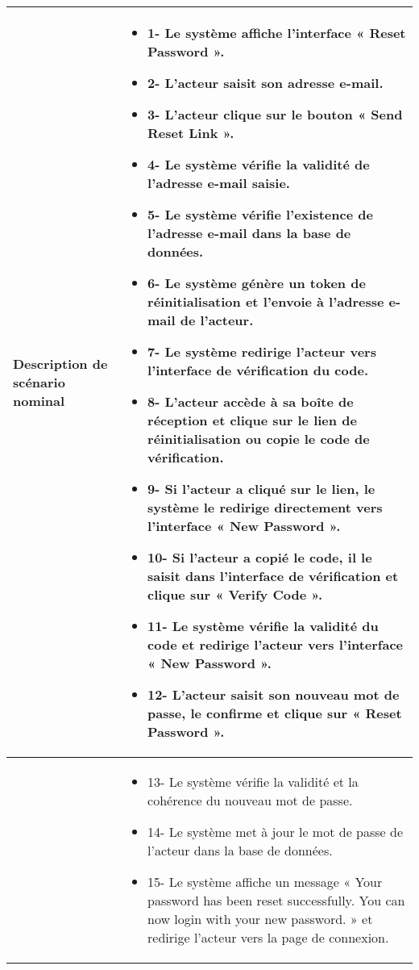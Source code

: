 \begin{longtable}{|>{\arraybackslash}p{4.2cm}|>{\arraybackslash}p{12.5cm}|}
\\
\hline
\textbf{Description de scénario nominal }  &
\begin{itemize}[label=]
\item{1-} Le système affiche l'interface « Reset Password ».
\item{2-} L'acteur saisit son adresse e-mail.
\item{3-} L'acteur clique sur le bouton « Send Reset Link ».
\item{4-} Le système vérifie la validité de l'adresse e-mail saisie.
\item{5-} Le système vérifie l'existence de l'adresse e-mail dans la base de données.
\item{6-} Le système génère un token de réinitialisation et l'envoie à l'adresse e-mail de l'acteur.
\item{7-} Le système redirige l'acteur vers l'interface de vérification du code.
\item{8-} L'acteur accède à sa boîte de réception et clique sur le lien de réinitialisation ou copie le code de vérification.
\item{9-} Si l'acteur a cliqué sur le lien, le système le redirige directement vers l'interface « New Password ».
\item{10-} Si l'acteur a copié le code, il le saisit dans l'interface de vérification et clique sur « Verify Code ».
    \item{11-} Le système vérifie la validité du code et redirige l'acteur vers l'interface « New Password ».
    \item{12-} L'acteur saisit son nouveau mot de passe, le confirme et clique sur « Reset Password ».

\end{itemize}\\
\hline
\textbf{} &

\begin{itemize}[label=]

    \item{13-} Le système vérifie la validité et la cohérence du nouveau mot de passe.
    \item{14-} Le système met à jour le mot de passe de l'acteur dans la base de données.
    \item{15-} Le système affiche un message « Your password has been reset successfully. You can now login with your new password. » et redirige l'acteur vers la page de connexion.
\end{itemize} \\
\hline


\end{longtable}
